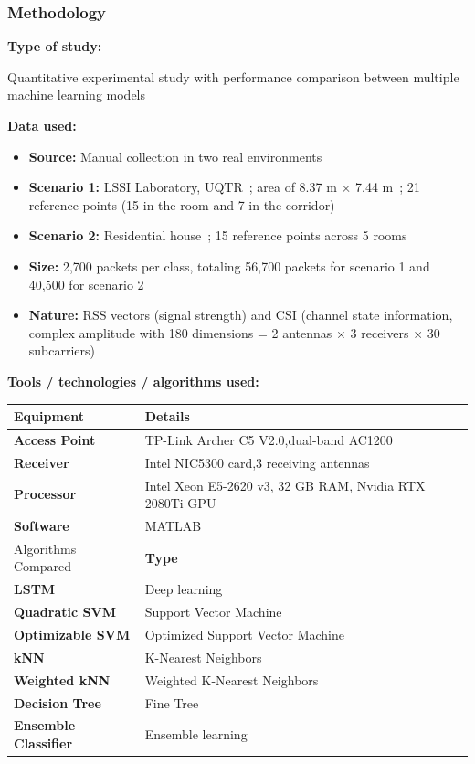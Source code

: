 \documentclass{ipgpmaster}
\begin{document}
\subsubsection{\textbf{Methodology}}

\textbf{Type of study:}

 Quantitative experimental study with performance comparison between multiple machine learning models

\textbf{Data used:}

\begin{itemize}
    \item \textbf{Source:} Manual collection in two real environments 
    \item \textbf{Scenario 1:} LSSI Laboratory, UQTR ; area of 8.37 m × 7.44 m ; 21 reference points (15 in the room and  7 in the corridor) 
    \item \textbf{Scenario 2:} Residential house ; 15 reference points across 5 rooms 
    \item \textbf{Size:} 2,700 packets per class, totaling 56,700 packets for scenario 1 and 40,500 for scenario 2 
    \item \textbf{Nature:} RSS vectors (signal strength) and CSI (channel state information, complex amplitude with 180 dimensions = 2 antennas × 3 receivers × 30 subcarriers) 
\end{itemize}
\textbf{Tools / technologies / algorithms used:}

\begin{table}
\centering

\begin{tabular}{| l | l |}
\hline
Equipment & Details \\
\hline
\textbf{Access Point} & TP-Link Archer C5 V2.0,dual-band AC1200 \\
\hline
\textbf{Receiver} & Intel NIC5300 card,3 receiving antennas \\
\hline
\textbf{Processor} & Intel Xeon E5-2620 v3, 32 GB RAM, Nvidia RTX 2080Ti GPU \\
\hline
\textbf{Software} & MATLAB \\
\hline
Algorithms Compared & \textbf{Type} \\
\hline
\textbf{LSTM} & Deep learning \\
\hline
\textbf{Quadratic SVM} & Support Vector Machine \\
\hline
\textbf{Optimizable SVM} & Optimized Support Vector Machine \\
\hline
\textbf{kNN} & K-Nearest Neighbors \\
\hline
\textbf{Weighted kNN} & Weighted K-Nearest Neighbors \\
\hline
\textbf{Decision Tree} & Fine Tree \\
\hline
\textbf{Ensemble Classifier} & Ensemble learning \\
\hline

\end{tabular}

\end{table}
\end{document}
